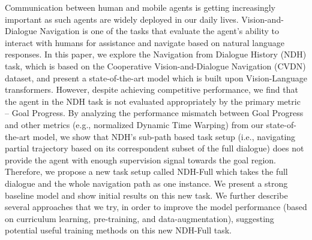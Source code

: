Communication between human and mobile agents is getting increasingly important as such agents are widely deployed in our daily lives. Vision-and-Dialogue Navigation is one of the tasks that evaluate the agent's ability to interact with humans for assistance and navigate based on natural language responses. In this paper, we explore the Navigation from Dialogue History (NDH) task, which is based on the Cooperative Vision-and-Dialogue Navigation (CVDN) dataset, and present a state-of-the-art model which is built upon Vision-Language transformers. However, despite achieving competitive performance, we find that the agent in the NDH task is not evaluated appropriately by the primary metric -- Goal Progress. By analyzing the performance mismatch between Goal Progress and other metrics (e.g., normalized Dynamic Time Warping) from our state-of-the-art model, we show that NDH's sub-path based task setup (i.e., navigating partial trajectory based on its correspondent subset of the full dialogue) does not provide the agent with enough supervision signal towards the goal region. Therefore, we propose a new task setup called NDH-Full which takes the full dialogue and the whole navigation path as one instance. We present a strong baseline model and show initial results on this new task. We further describe several approaches that we try, in order to improve the model performance (based on curriculum learning, pre-training, and data-augmentation), suggesting potential useful training methods on this new NDH-Full task.
